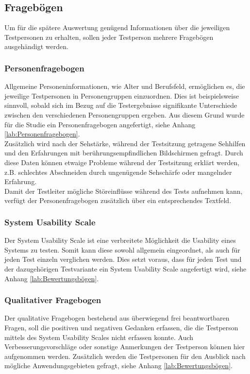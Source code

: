 \documentclass[a4paper,BCOR2mm,12pt,bibliography=totoc,listof=totoc,abstracton]{scrreprt}
\begin{document}
\subsection{Fragebögen}
Um für die spätere Auswertung genügend Informationen über die jeweiligen Testpersonen zu erhalten, sollen jeder Testperson mehrere Fragebögen ausgehändigt werden.

\subsubsection{Personenfragebogen}
Allgemeine Personeninformationen, wie Alter und Berufsfeld, ermöglichen es, die jeweilige Testpersonen in Personengruppen einzuordnen. Dies ist beispielsweise sinnvoll, sobald sich im Bezug auf die Testergebnisse signifikante Unterschiede zwischen den verschiedenen Personengruppen ergeben. Aus diesem Grund wurde für die Studie ein Personenfragebogen angefertigt, siehe Anhang \ref{lab:Personenfragebogen}.\\
Zusätzlich wird nach der Sehstärke, während der Testsitzung getragene Sehhilfen und den Erfahrungen mit berührungsempfindlichen Bildschirmen gefragt. Durch diese Daten können etwaige Probleme während der Testsitzung erklärt werden, z.B. schlechtes Abschneiden durch ungenügende Sehschärfe oder mangelnder Erfahrung.\\
Damit der Testleiter mögliche Störeinflüsse während des Tests aufnehmen kann, verfügt der Personenfragebogen zusätzlich über ein entsprechendes Textfeld.

\subsubsection{System Usability Scale}
Der System Usability Scale ist eine verbreitete Möglichkeit die Usability eines Systems zu testen. Somit kann diese sowohl allgemein eingeordnet, als auch für jeden Test einzeln verglichen werden. Dies setzt voraus, dass für jeden Test und der dazugehörigen Testvariante ein System Usability Scale angefertigt wird, siehe Anhang \ref{lab:Bewertungsbögen}.

\subsubsection{Qualitativer Fragebogen}
Der qualitative Fragebogen bestehend aus überwiegend frei beantwortbaren Fragen, soll die positiven und negativen Gedanken erfassen, die die Testperson mittels des System Usability Scales nicht erfassen konnte. Auch Verbesserungsvorschläge oder sonstige Anmerkungen der Testperson können hier aufgenommen werden. Zusätzlich werden die Testpersonen für den Ausblick nach mögliche Anwendungsgebieten gefragt, siehe Anhang \ref{lab:Bewertungsbögen}.
\end{document}
